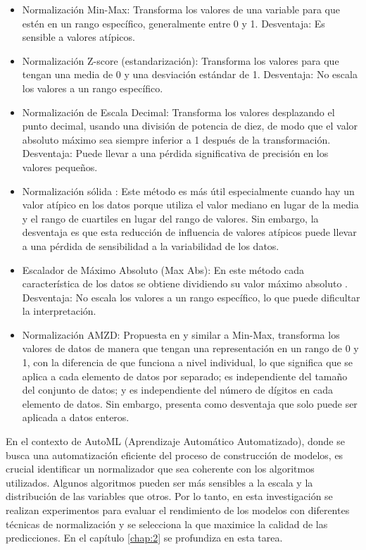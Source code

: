 \begin{itemize}
	\item Normalización Min-Max: Transforma los valores de una variable para que estén en un rango específico, generalmente entre 0 y 1. Desventaja: Es sensible a valores atípicos.
	\item Normalización Z-score (estandarización): Transforma los valores para que tengan una media de 0 y una desviación estándar de 1. Desventaja: No escala los valores a un rango específico.
	\item Normalización de Escala Decimal: Transforma los valores desplazando el punto decimal, usando una división de potencia de diez, de modo que el valor absoluto máximo sea siempre inferior a 1 después de la transformación. Desventaja: Puede llevar a una pérdida significativa de precisión en los valores pequeños. 
	\item Normalización sólida \citep{polatgil2022investigation}: Este método es más útil especialmente cuando hay un valor atípico en los datos porque utiliza el valor mediano en lugar de la media y el rango de cuartiles en lugar del rango de valores. Sin embargo, la desventaja es que esta reducción de influencia de valores atípicos puede llevar a una pérdida de sensibilidad a la variabilidad de los datos.
	\item Escalador de Máximo Absoluto (Max Abs): En este método cada característica de los datos se obtiene dividiendo su valor máximo absoluto \citep{polatgil2022investigation}. Desventaja: No escala los valores a un rango específico, lo que puede dificultar la interpretación.
	\item Normalización AMZD: Propuesta en \citep{patro2015normalization} y similar a Min-Max, transforma los valores de datos de manera que tengan una representación en un rango de 0 y 1, con la diferencia de que funciona a nivel individual, lo que significa que se aplica a cada elemento de datos por separado; es independiente del tamaño del conjunto de datos; y
	es independiente del número de dígitos en cada elemento de datos. Sin embargo,  presenta como desventaja que solo puede ser aplicada a datos enteros.
\end{itemize}

 En el contexto de AutoML (Aprendizaje Automático Automatizado), donde se busca una automatización eficiente del proceso de construcción de modelos, es crucial identificar un normalizador que sea coherente con los algoritmos utilizados. Algunos algoritmos pueden ser más sensibles a la escala y la distribución de las variables que otros. Por lo tanto, en esta investigación se realizan experimentos para evaluar el rendimiento de los modelos con diferentes técnicas de normalización y se selecciona la que maximice la calidad de las predicciones. En el capítulo \ref{chap:2} se profundiza en esta tarea.
 
